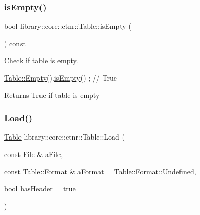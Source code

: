 \subsubsection{\texorpdfstring{is\+Empty()}{isEmpty()}}
{\footnotesize\ttfamily bool library\+::core\+::ctnr\+::\+Table\+::is\+Empty (\begin{DoxyParamCaption}{ }\end{DoxyParamCaption}) const}



Check if table is empty. 


\begin{DoxyCode}
\hyperlink{classlibrary_1_1core_1_1ctnr_1_1_table_ada8d9997351d5aea25ae8e563eedeb1c}{Table::Empty}().\hyperlink{classlibrary_1_1core_1_1ctnr_1_1_table_ae0b9f9ee022ed72e06ed41f324855c1a}{isEmpty}() ; \textcolor{comment}{// True}
\end{DoxyCode}


\begin{DoxyReturn}{Returns}
True if table is empty 
\end{DoxyReturn}
\mbox{\label{classlibrary_1_1core_1_1ctnr_1_1_table_a423b5a739e3ed0127bc14572042c158e}} 
\subsubsection{\texorpdfstring{Load()}{Load()}}
{\footnotesize\ttfamily \hyperlink{classlibrary_1_1core_1_1ctnr_1_1_table}{Table} library\+::core\+::ctnr\+::\+Table\+::\+Load (\begin{DoxyParamCaption}\item[{const \hyperlink{classlibrary_1_1core_1_1fs_1_1_file}{File} \&}]{a\+File,  }\item[{const \hyperlink{classlibrary_1_1core_1_1ctnr_1_1_table_ab1d81689432c3a6bc960d33db1e11a4c}{Table\+::\+Format} \&}]{a\+Format = {\ttfamily \hyperlink{classlibrary_1_1core_1_1ctnr_1_1_table_ab1d81689432c3a6bc960d33db1e11a4caec0fc0100c4fc1ce4eea230c3dc10360}{Table\+::\+Format\+::\+Undefined}},  }\item[{bool}]{has\+Header = {\ttfamily true} }\end{DoxyParamCaption})\hspace{0.3cm}{\ttfamily [static]}}




